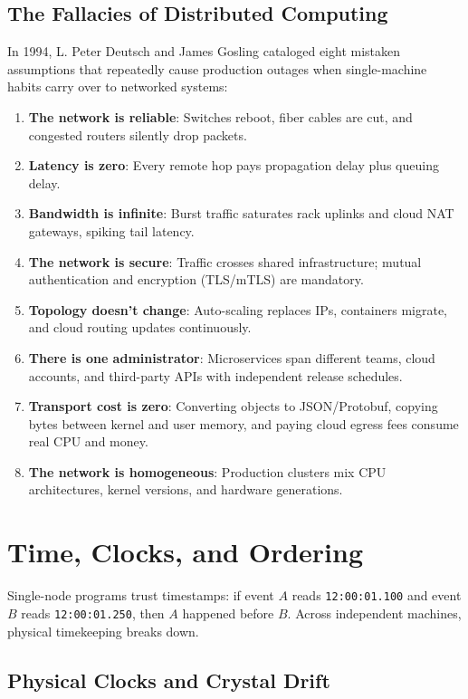 \subsection{The Fallacies of Distributed Computing}

In 1994, L. Peter Deutsch and James Gosling cataloged eight mistaken assumptions that repeatedly cause production outages when single-machine habits carry over to networked systems:
\begin{enumerate}[leftmargin=18pt]
  \item \textbf{The network is reliable}: Switches reboot, fiber cables are cut, and congested routers silently drop packets.
  \item \textbf{Latency is zero}: Every remote hop pays propagation delay plus queuing delay.
  \item \textbf{Bandwidth is infinite}: Burst traffic saturates rack uplinks and cloud NAT gateways, spiking tail latency.
  \item \textbf{The network is secure}: Traffic crosses shared infrastructure; mutual authentication and encryption (TLS/mTLS) are mandatory.
  \item \textbf{Topology doesn't change}: Auto-scaling replaces IPs, containers migrate, and cloud routing updates continuously.
  \item \textbf{There is one administrator}: Microservices span different teams, cloud accounts, and third-party APIs with independent release schedules.
  \item \textbf{Transport cost is zero}: Converting objects to JSON/Protobuf, copying bytes between kernel and user memory, and paying cloud egress fees consume real CPU and money.
  \item \textbf{The network is homogeneous}: Production clusters mix CPU architectures, kernel versions, and hardware generations.
\end{enumerate}

\section{Time, Clocks, and Ordering}

Single-node programs trust timestamps: if event $A$ reads \texttt{12:00:01.100} and event $B$ reads \texttt{12:00:01.250}, then $A$ happened before $B$. Across independent machines, physical timekeeping breaks down.

\subsection{Physical Clocks and Crystal Drift}

